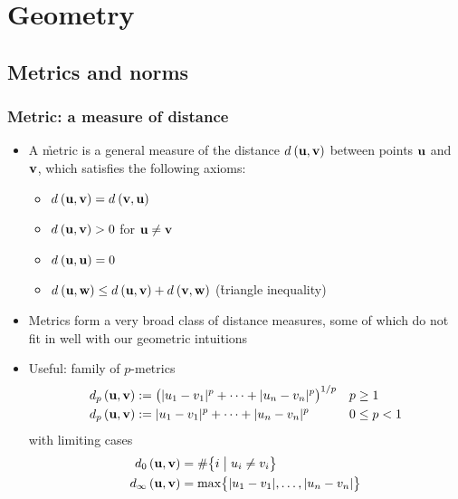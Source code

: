 \documentclass[t]{beamer} %
\begin{document}
\section{Geometry}

\subsection{Metrics and norms}

\begin{frame}
  \frametitle{Metric: a measure of distance}

  \begin{itemize}
  \item A \h{metric} is a general measure of the distance $\dist{\vu}{\vv}$
    between points $\vu$ and $\vv$, which satisfies the following axioms:
    \begin{itemize}
      \item $\dist{\vu}{\vv} = \dist{\vv}{\vu}$
      \item $\dist{\vu}{\vv} > 0$ for $\vu \neq \vv$
      \item $\dist{\vu}{\vu} = 0$
      \item $\dist{\vu}{\vw} \leq \dist{\vu}{\vv} + \dist{\vv}{\vw}$
        (\h{triangle inequality})
    \end{itemize}
  \item Metrics form a very broad class of distance measures, some of which do
    not fit in well with our geometric intuitions
  \item<2-> Useful: family of  $p$-metrics
    \begin{align*}
      \dist[p]{\vu}{\vv} 
      &\coloneq \bigl( \abs{u_1 - v_1}^p + \dots + \abs{u_n - v_n}^p \bigr)^{1/p}
      && p \geq 1 \\
      \dist[p]{\vu}{\vv} 
      &\coloneq \abs{u_1 - v_1}^p + \dots + \abs{u_n - v_n}^p 
      && 0 \leq p < 1
    \end{align*}
    with limiting cases
    \begin{align*}
      \dist[0]{\vu}{\vv} &= \# \bigsetdef{i}{u_i \neq v_i} \\
      \dist[\infty]{\vu}{\vv} &= \max \bigset{\abs{u_1 - v_1}, \ldots, \abs{u_n - v_n}}
    \end{align*}
  \end{itemize}
\end{frame}
\end{document}
